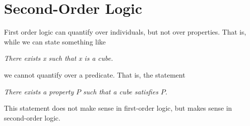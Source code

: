 \section{Second-Order Logic} 

  First order logic can quantify over individuals, but not over properties. That is, while we can state something like 

  \begin{center}
    \textit{There exists x such that x is a cube.}
  \end{center} 

  we cannot quantify over a predicate. That is, the statement 
  
  \begin{center}
    \textit{There exists a property $P$ such that a cube satisfies $P$.}
  \end{center}

  This statement does not make sense in first-order logic, but makes sense in second-order logic. 

